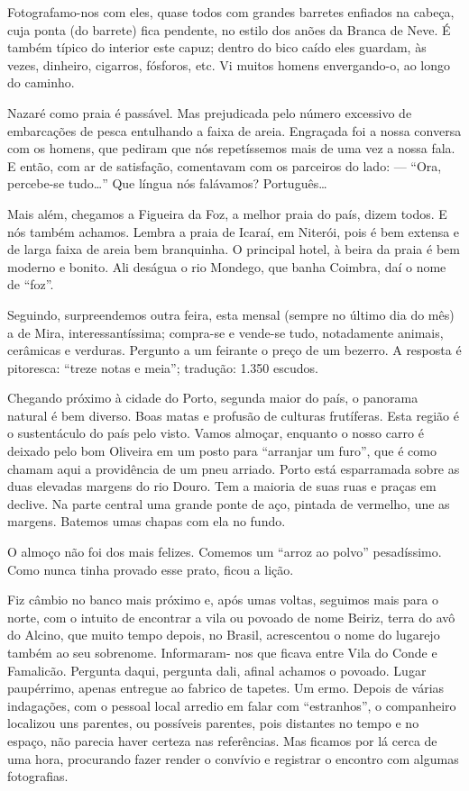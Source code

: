 Fotografamo-nos com eles, quase todos com grandes barretes enfiados na cabeça, cuja ponta (do barrete) fica pendente, no estilo dos anões da Branca de Neve. É também típico do interior este capuz; dentro do bico caído eles guardam, às vezes, dinheiro, cigarros, fósforos, etc. Vi muitos homens envergando-o, ao longo do caminho.

Nazaré como praia é passável. Mas prejudicada pelo número excessivo de embarcações de pesca entulhando a faixa de areia. Engraçada foi a nossa conversa com os homens, que pediram que nós repetíssemos mais de uma vez a nossa fala. E então, com ar de satisfação, comentavam com os parceiros do lado: --- ``Ora, percebe-se tudo\ldots'' Que língua nós falávamos? Português\ldots

Mais além, chegamos a Figueira da Foz, a melhor praia do país, dizem todos. E nós também achamos. Lembra a praia de Icaraí, em Niterói, pois é bem extensa e de larga faixa de areia bem branquinha. O principal hotel, à beira da praia é bem moderno e bonito. Ali deságua o rio Mondego, que banha Coimbra, daí o nome de ``foz''.

Seguindo, surpreendemos outra feira, esta mensal (sempre no último dia do mês) a de Mira, interessantíssima; compra-se e vende-se tudo, notadamente animais, cerâmicas e verduras. Pergunto a um feirante o preço de um bezerro. A resposta é pitoresca: ``treze notas e meia''; tradução: 1.350 escudos.

Chegando próximo à cidade do Porto, segunda maior do país, o panorama natural é bem diverso. Boas matas e profusão de culturas frutíferas. Esta região é o sustentáculo do país pelo visto. Vamos almoçar, enquanto o nosso carro é deixado pelo bom Oliveira em um posto para ``arranjar um furo'', que é como chamam aqui a providência de um pneu arriado. Porto está esparramada sobre as duas elevadas margens do rio Douro. Tem a maioria de suas ruas e praças em declive. Na parte central uma grande ponte de aço, pintada de vermelho, une as margens. Batemos umas chapas com ela no fundo.

O almoço não foi dos mais felizes. Comemos um ``arroz ao polvo'' pesadíssimo. Como nunca tinha provado esse prato, ficou a lição.

Fiz câmbio no banco mais próximo e, após umas voltas, seguimos mais para o norte, com o intuito de encontrar a vila ou povoado de nome Beiriz, terra do avô do Alcino, que muito tempo depois, no Brasil, acrescentou o nome do lugarejo também ao seu sobrenome. Informaram- nos que ficava entre Vila do Conde e Famalicão. Pergunta daqui, pergunta dali, afinal achamos o povoado. Lugar paupérrimo, apenas entregue ao fabrico de tapetes. Um ermo. Depois de várias indagações, com o pessoal local arredio em falar com ``estranhos'', o companheiro localizou uns parentes, ou possíveis parentes, pois distantes no tempo e no espaço, não parecia haver certeza nas referências. Mas ficamos por lá cerca de uma hora, procurando fazer render o convívio e registrar o encontro com algumas fotografias.

